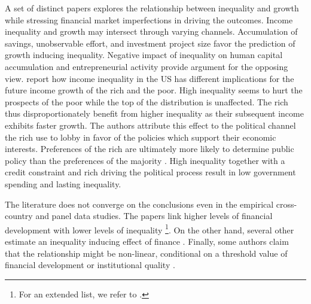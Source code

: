 \begin{refsection}
A set of distinct papers explores the relationship between inequality and growth while stressing financial market imperfections in driving the outcomes. Income inequality and growth may intersect through varying channels. Accumulation of savings, unobservable effort, and investment project size favor the prediction of growth inducing inequality. Negative impact of inequality on human capital accumulation and entrepreneurial activity provide argument for the opposing view. 
\textcite{milanovicvan2018inequality} report how income inequality in the \ac{US} has different implications for the future income growth of the rich and the poor. High inequality seems to hurt the prospects of the poor while the top of the distribution is unaffected. The rich thus disproportionately benefit from higher inequality as their subsequent income exhibits faster growth. The authors attribute this effect to the political channel the rich use to lobby in favor of the policies which support their economic interests. Preferences of the rich are ultimately more likely to determine public policy than the preferences of the majority \parencite{gilens_page_2014}. High inequality together with a credit constraint and rich driving the political process result in low government spending and lasting inequality.

The literature does not converge on the conclusions even in the empirical cross-country and panel data studies. The papers link higher levels of financial development with lower levels of inequality \parencite{beck2007finance, hamori2012, gimet2011closer, kunieda2014finance}\footnote{For an extended list, we refer to \textcite{de2017finance}.}. On the other hand, several other estimate an inequality inducing effect of finance \parencite{Jaumotte2013, jauch2016financial, de2017finance}. Finally, some authors claim that the relationship might be non-linear, conditional on a threshold value of financial development \parencite{kim2011nonlinearity,tan2012nonlinear} or institutional quality \parencite{LawSingh2014, delis2014}.


\end{refsection}
